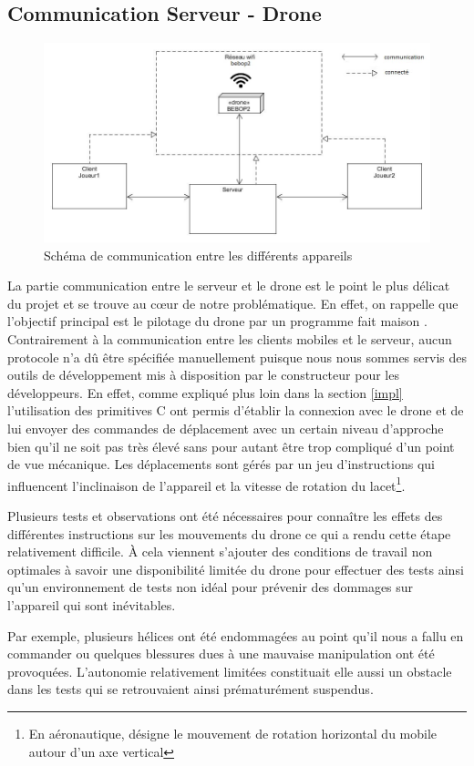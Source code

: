 \subsection{Communication Serveur - Drone}

\begin{figure}[ht]
\begin{center}
\includegraphics[scale=0.45]{images/architecture.jpg}
\caption{Schéma de communication entre les différents appareils}
\end{center}
\end{figure}

La partie communication entre le serveur et le drone est le point le plus délicat du projet et se trouve au c\oe{}ur de notre problématique. En effet, on rappelle que l'objectif principal est le pilotage du drone par un programme \og fait maison \fg{}. Contrairement à la communication entre les clients mobiles et le serveur, aucun protocole n'a dû être spécifiée manuellement puisque nous nous sommes servis des outils de développement mis à disposition par le constructeur pour les développeurs. En effet, comme expliqué plus loin dans la section \ref{impl} l'utilisation des primitives C ont permis d'établir la connexion avec le drone et de lui envoyer des commandes de déplacement avec un certain niveau d'approche bien qu'il ne soit pas très élevé sans pour autant être trop compliqué d'un point de vue mécanique. Les déplacements sont gérés par un jeu d'instructions qui influencent l'inclinaison de l'appareil et la vitesse de rotation du lacet\footnote{En aéronautique, désigne le mouvement de rotation horizontal du mobile autour d'un axe vertical}. 

Plusieurs tests et observations ont été nécessaires pour connaître les effets des différentes instructions sur les mouvements du drone ce qui a rendu cette étape relativement difficile. À cela viennent s'ajouter des conditions de travail non optimales à savoir une disponibilité limitée du drone pour effectuer des tests ainsi qu'un environnement de tests non idéal pour prévenir des dommages sur l'appareil qui sont inévitables.

Par exemple, plusieurs hélices ont été endommagées au point qu'il nous a fallu en commander ou quelques blessures dues à une mauvaise manipulation ont été provoquées. L'autonomie relativement limitées constituait elle aussi un obstacle dans les tests qui se retrouvaient ainsi prématurément suspendus.

